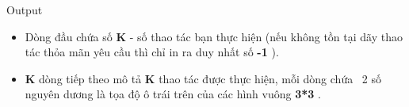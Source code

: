 Output
\begin{itemize}
	\item     Dòng đầu chứa số    \textbf{     K    }    - số thao tác bạn thực hiện (nếu không tồn tại dãy thao tác thỏa mãn yêu cầu thì chỉ in ra duy nhất số    \textbf{     -1    }    ).   
	\item \textbf{     K    }    dòng tiếp theo mô tả    \textbf{     K    }    thao tác được thực hiện, mỗi dòng chứa  2 số nguyên dương là tọa độ ô trái trên của các hình vuông    \textbf{     3*3    }    .   
\end{itemize}